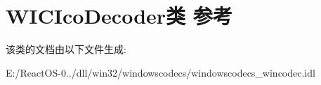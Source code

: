 \hypertarget{class_w_i_c_ico_decoder}{}\section{W\+I\+C\+Ico\+Decoder类 参考}
\label{class_w_i_c_ico_decoder}


该类的文档由以下文件生成\+:\begin{DoxyCompactItemize}
\item 
E\+:/\+React\+O\+S-\/0../dll/win32/windowscodecs/windowscodecs\+\_\+wincodec.\+idl\end{DoxyCompactItemize}
